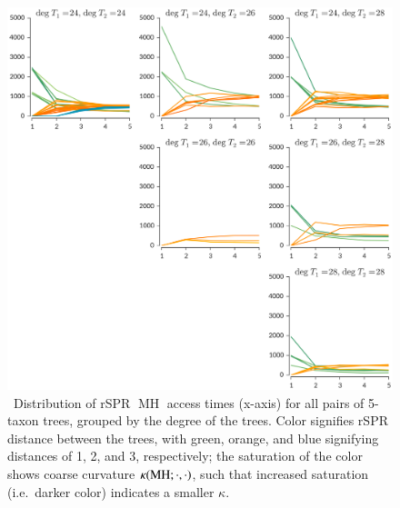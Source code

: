 \documentclass[]{elsarticle}
\let\MYoriglatexcaption\caption
\renewcommand{\caption}[2][\relax]{\MYoriglatexcaption[#2]{#2}}
\newcommand{\MH}{\operatorname{MH}}
\newcommand{\curvature}[2][]{%
    \ifthenelse{\equal{#1}{}}%
		{\kappa(#2)}%
		{\kappa_{#1}(#2)}%
}
\begin{document}
\begin{figure}
	\includegraphics[width=\textwidth]{figs/access5-distribution.png}

	\caption{\
        Distribution of rSPR $\MH$ access times (x-axis) for all pairs of 5-taxon trees, grouped by the degree of the trees.
				Color signifies rSPR distance between the trees, with green, orange, and blue signifying distances of 1, 2, and 3, respectively; the saturation of the color shows coarse curvature $\curvature{\MH; \cdot, \cdot}$, such that increased saturation (i.e.\ darker color) indicates a smaller $\kappa$.
	}
	\label{fig:kappa-access-distribution}
\end{figure}
\end{document}

